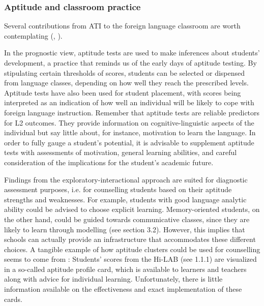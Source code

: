 \documentclass[output=paper]{langscibook}
\begin{document}
\subsubsection{Aptitude and classroom practice} %

Several contributions from ATI to the foreign language classroom are worth contemplating (\citealt{Cook2001}, \citealt{Ranta2008}).

In the prognostic view, aptitude tests are used to make inferences about students’ development, a practice that reminds us of the early days of aptitude testing. By stipulating certain thresholds of scores, students can be selected or dispensed from language classes, depending on how well they reach the prescribed levels. Aptitude tests have also been used for student placement, with scores being interpreted as an indication of how well an individual will be likely to cope with foreign language instruction. Remember that aptitude tests are reliable predictors for L2 outcomes. They provide information on cognitive-linguistic aspects of the individual but say little about, for instance, motivation to learn the language. In order to fully gauge a student’s potential, it is advisable to supplement aptitude tests with assessments of motivation, general learning abilities, and careful consideration of the implications for the student’s academic future.

Findings from the exploratory-interactional approach are suited for diagnostic assessment purposes, i.e. for counselling students based on their aptitude strengths and weaknesses. For example, students with good language analytic ability could be advised to choose explicit learning. Memory-oriented students, on the other hand, could be guided towards communicative classes, since they are likely to learn through modelling (see section 3.2). However, this implies that schools can actually provide an infrastructure that accommodates these different choices. A tangible example of how aptitude clusters could be used for counselling seems to come from \citet{Doughty2013}: Students’ scores from the Hi-LAB (see 1.1.1) are visualized in a so-called aptitude profile card, which is available to learners and teachers along with advice for individual learning. Unfortunately, there is little information available on the effectiveness and exact implementation of these cards. 
\end{document}
